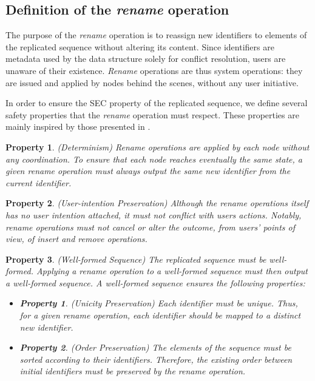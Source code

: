 \documentclass[10pt,journal,compsoc]{IEEEtran}
\newtheorem{property}{Property}
\newtheorem{subproperty}{Property}[property]
\begin{document}
\subsection{Definition of the \emph{rename} operation}

\label{sec:definition-rename-operation}

The purpose of the \emph{rename} operation is to reassign new identifiers to elements of the replicated sequence without altering its content.
Since identifiers are metadata used by the data structure solely for conflict resolution, users are unaware of their existence.
\emph{Rename} operations are thus system operations: they are issued and applied by nodes behind the scenes, without any user initiative.

In order to ensure the \ac{SEC} property of the replicated sequence, we define several safety properties that the \emph{rename} operation must respect.
These properties are mainly inspired by those presented in \cite{zawirski:hal-01248197}.

\begin{property}(Determinism)
    \emph{Rename} operations are applied by each node without any coordination.
    To ensure that each node reaches eventually the same state, a given \emph{rename} operation must always output the same new identifier from the current identifier.
\end{property}

\begin{property}(User-intention Preservation)
    Although the \emph{rename} operations itself has no user intention attached, it must not conflict with users actions.
    Notably, \emph{rename} operations must not cancel or alter the outcome, from users' points of view, of \emph{insert} and \emph{remove} operations.
\end{property}

\begin{property}(Well-formed Sequence)
    The replicated sequence must be well-formed.
    Applying a \emph{rename} operation to a well-formed sequence must then output a well-formed sequence.
    A well-formed sequence ensures the following properties:
    \begin{itemize}[noitemsep]
        \item[~]
        \begin{subproperty}(Unicity Preservation)
            Each identifier must be unique.
            Thus, for a given \emph{rename} operation, each identifier should be mapped to a distinct new identifier.
        \end{subproperty}
        \item[~]
        \begin{subproperty}(Order Preservation)
            The elements of the sequence must be sorted according to their identifiers.
            Therefore, the existing order between initial identifiers must be preserved by the \emph{rename} operation.
        \end{subproperty}
    \end{itemize}
\end{property}
\end{document}
